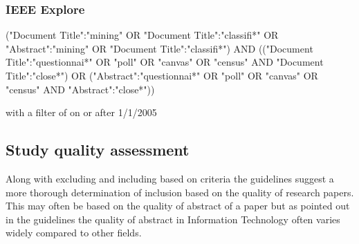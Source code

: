 \subsubsection{IEEE Explore}
\noindent
("Document Title":"mining" OR "Document Title":"classifi*" OR "Abstract":"mining"
OR "Document Title":"classifi*") AND (("Document Title":"questionnai*" OR "poll" OR "canvas" OR "census" AND "Document Title":"close*") OR ("Abstract":"questionnai*" OR "poll" OR "canvas" OR "census" AND "Abstract":"close*"))


\noindent
with a filter of on or after 1/1/2005


\subsection{Study quality assessment}

Along with excluding and including based on criteria the guidelines suggest a more thorough determination of inclusion based on the quality of research papers. This may often be based on the quality of abstract of a paper but as pointed out in the guidelines the quality of abstract in Information Technology often varies widely compared to other fields.








